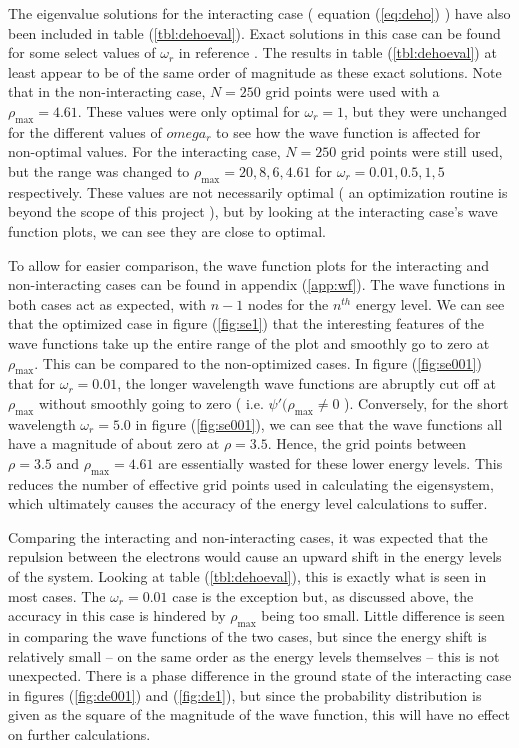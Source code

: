 \documentclass[a4paper,12pt]{report}
\begin{document}
The eigenvalue solutions for the interacting case ( equation (\ref{eq:deho}) ) have also been included in table (\ref{tbl:dehoeval}). Exact solutions in this case can be found for some select values of $\omega_r$ in reference \cite{Taut:1993}. The results in table (\ref{tbl:dehoeval}) at least appear to be of the same order of magnitude as these exact solutions. Note that in the non-interacting case, $N=250$ grid points were used with a $\rho_{\mathrm{max}} = 4.61$. These values were only optimal for $\omega_r = 1$, but they were unchanged for the different values of $omega_r$ to see how the wave function is affected for non-optimal values. For the interacting case, $N=250$ grid points were still used, but the range was changed to $\rho_{\mathrm{max}} = 20, 8, 6, 4.61$ for $\omega_r = 0.01,0.5, 1,5$ respectively. These values are not necessarily optimal ( an optimization routine is beyond the scope of this project ), but by looking at the interacting case's wave function plots, we can see they are close to optimal.

To allow for easier comparison, the wave function plots for the interacting and non-interacting cases can be found in appendix (\ref{app:wf}). The wave functions in both cases act as expected, with $n-1$ nodes for the $n^{th}$ energy level. We can see that the optimized case in figure (\ref{fig:se1}) that the interesting features of the wave functions take up the entire range of the plot and smoothly go to zero at $\rho_{\mathrm{max}}$. This can be compared to the non-optimized cases. In figure (\ref{fig:se001}) that for $\omega_r = 0.01$, the longer wavelength wave functions are abruptly cut off at $\rho_{\mathrm{max}}$ without smoothly going to zero ( i.e. $\psi'(\rho_{\mathrm{max}} \neq 0$ ). Conversely, for the short wavelength $\omega_r = 5.0$ in figure (\ref{fig:se001}), we can see that the wave functions all have a magnitude of about zero at $\rho = 3.5$. Hence, the grid points between $\rho = 3.5$ and $\rho_{\mathrm{max}} = 4.61$ are essentially wasted for these lower energy levels. This reduces the number of effective grid points used in calculating the eigensystem, which ultimately causes the accuracy of the energy level calculations to suffer.

Comparing the interacting and non-interacting cases, it was expected that the repulsion between the electrons would cause an upward shift in the energy levels of the system. Looking at table (\ref{tbl:dehoeval}), this is exactly what is seen in most cases. The $\omega_r = 0.01$ case is the exception but, as discussed above, the accuracy in this case is hindered by $\rho_{\mathrm{max}}$ being too small. Little difference is seen in comparing the wave functions of the two cases, but since the energy shift is relatively small -- on the same order as the energy levels themselves -- this is not unexpected. There is a phase difference in the ground state of the interacting case in figures (\ref{fig:de001}) and (\ref{fig:de1}), but since the probability distribution is given as the square of the magnitude of the wave function, this will have no effect on further calculations.
\end{document}
